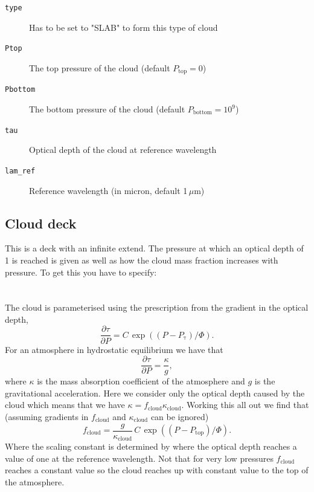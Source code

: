 \documentclass[12pt]{article}
\begin{document}
\begin{description}
\item[\texttt{type}]
Has to be set to "SLAB" to form this type of cloud
\item[\texttt{Ptop}]
The top pressure of the cloud (default $P_\mathrm{top}=0$)
\item[\texttt{Pbottom}]
The bottom pressure of the cloud (default $P_\mathrm{bottom}=10^9$)
\item[\texttt{tau}]
Optical depth of the cloud at reference wavelength
\item[\texttt{lam\_ref}]
Reference wavelength (in micron, default 1\,$\mu$m)
\end{description}

\subsection{Cloud deck}

This is a deck with an infinite extend. The pressure at which an optical depth of 1 is reached is given as well as how the cloud mass fraction increases with pressure. To get this you have to specify:
\\
\\
\\
The cloud is parameterised using the prescription from the gradient in the optical depth,
\begin{equation}
\frac{\partial \tau}{\partial P}=C\,\exp{((P-P_\mathrm{\tau})/\Phi)}.
\end{equation}
For an atmosphere in hydrostatic equilibrium we have that
\begin{equation}
\frac{\partial \tau}{\partial P}=\frac{\kappa}{g},
\end{equation}
where $\kappa$ is the mass absorption coefficient of the atmosphere and $g$ is the gravitational acceleration. Here we consider only the optical depth caused by the cloud which means that we have $\kappa=f_\mathrm{cloud}\kappa_\mathrm{cloud}$. Working this all out we find that (assuming gradients in $f_\mathrm{cloud}$ and $\kappa_\mathrm{cloud}$ can be ignored)
\begin{equation}
f_\mathrm{cloud}=\frac{g}{\kappa_\mathrm{cloud}}\,C\,\exp{((P-P_\mathrm{top})/\Phi)}.
\end{equation}
Where the scaling constant is determined by where the optical depth reaches a value of one at the reference wavelength. Not that for very low pressures $f_\mathrm{cloud}$ reaches a constant value so the cloud reaches up with constant value to the top of the atmosphere.
\end{document}
